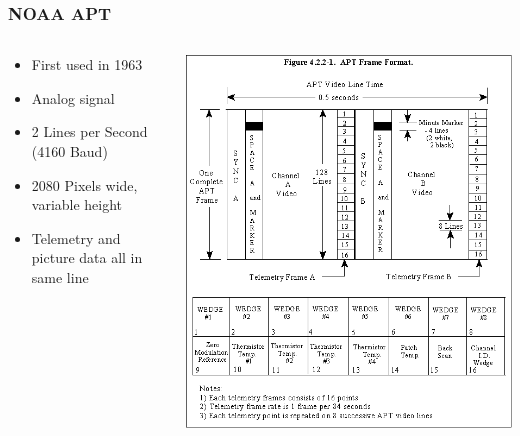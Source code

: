 \documentclass[]{beamer}
\begin{document}
\begin{frame}
    \frametitle{NOAA APT}
    \begin{columns}[T]
        \begin{column}[T]{5cm}
            \begin{itemize}
                \item First used in 1963
                \item Analog signal
                \item 2 Lines per Second (4160 Baud)
                \item 2080 Pixels wide, variable height
                \item Telemetry and picture data all in same line
            \end{itemize}
        \end{column}
        \begin{column}[T]{5cm}
            \includegraphics[height=0.5\paperwidth]{images/NOAA_APT_Frame_Format.png}
        \end{column}
    \end{columns}
\end{frame}
\end{document}
